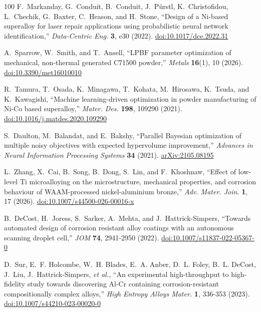 \documentclass[12pt,letterpaper]{article}
\begin{document}
\begin{thebibliography}{100}
F.~Markanday, G.~Conduit, B.~Conduit, J.~P\"urstl, K.~Christofidou, L.~Chechik, G.~Baxter, C.~Heason, and H.~Stone, ``Design of a Ni-based superalloy for laser repair applications using probabilistic neural network identification,'' \emph{Data-Centric Eng.} \textbf{3}, e30 (2022).
\href{https://doi.org/10.1017/dce.2022.31}{doi:10.1017/dce.2022.31}

A.~Sparrow, W.~Smith, and T.~Ansell, ``LPBF parameter optimization of mechanical, non-thermal generated C71500 powder,'' \emph{Metals} \textbf{16}(1), 10 (2026).
\href{https://doi.org/10.3390/met16010010}{doi:10.3390/met16010010}

R.~Tamura, T.~Osada, K.~Minagawa, T.~Kohata, M.~Hirosawa, K.~Tsuda, and K.~Kawagishi, ``Machine learning-driven optimization in powder manufacturing of Ni-Co based superalloy,'' \emph{Mater. Des.} \textbf{198}, 109290 (2021).
\href{https://doi.org/10.1016/j.matdes.2020.109290}{doi:10.1016/j.matdes.2020.109290}

S.~Daulton, M.~Balandat, and E.~Bakshy, ``Parallel Bayesian optimization of
multiple noisy objectives with expected hypervolume improvement,''
\emph{Advances in Neural Information Processing Systems} \textbf{34} (2021).
\href{https://arxiv.org/abs/2105.08195}{arXiv:2105.08195}

L.~Zhang, X.~Cai, B.~Song, B.~Dong, S.~Lin, and F.~Khoshnaw, ``Effect of low-level Ti microalloying on the microstructure, mechanical properties, and corrosion behaviour of WAAM-processed nickel-aluminium bronze,'' \emph{Adv. Mater. Join.} \textbf{1}, 17 (2026).
\href{https://doi.org/10.1007/s44500-026-00016-x}{doi:10.1007/s44500-026-00016-x}

B.~DeCost, H.~Joress, S.~Sarker, A.~Mehta, and J.~Hattrick-Simpers,
``Towards automated design of corrosion resistant alloy coatings with an
autonomous scanning droplet cell,'' \emph{JOM} \textbf{74}, 2941-2950 (2022).
\href{https://doi.org/10.1007/s11837-022-05367-0}{doi:10.1007/s11837-022-05367-0}

D.~Sur, E.~F. Holcombe, W.~H. Blades, E.~A. Anber, D.~L. Foley, B.~L. DeCost,
J.~Liu, J.~Hattrick-Simpers, \emph{et al.}, ``An experimental high-throughput
to high-fidelity study towards discovering Al-Cr containing
corrosion-resistant compositionally complex alloys,'' \emph{High Entropy
Alloys Mater.} \textbf{1}, 336-353 (2023).
\href{https://doi.org/10.1007/s44210-023-00020-0}{doi:10.1007/s44210-023-00020-0}


\end{thebibliography}
\end{document}

